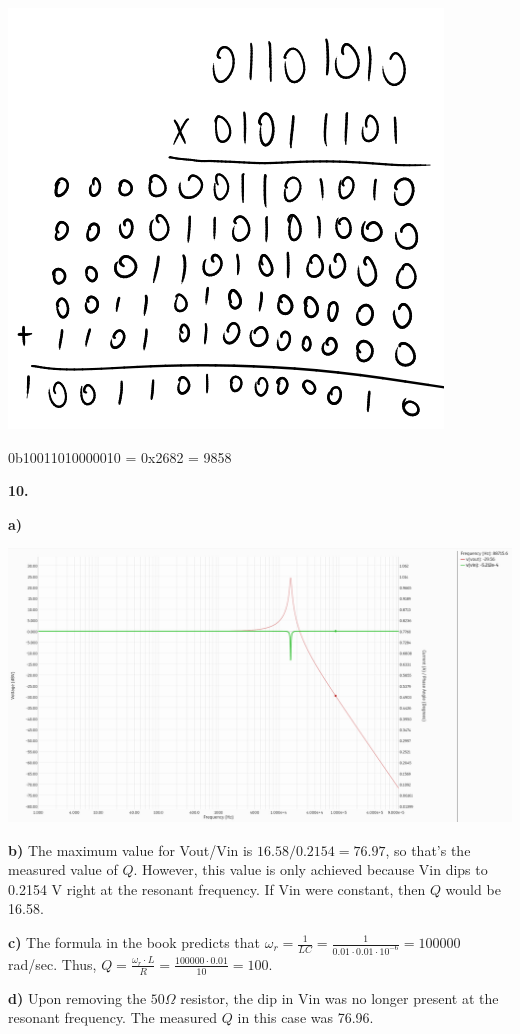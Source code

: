 \documentclass{article}
\begin{document}
    \begin{center}\includegraphics[scale=.5]{multiplication.png}\end{center}

    0b10011010000010 = 0x2682 = 9858

\newpage\noindent\textbf{10.}

\textbf{a)}
\begin{center}
    \includegraphics[scale=.3]{10a.png}
\end{center}

\textbf{b)} The maximum value for Vout/Vin is $16.58/0.2154 = 76.97$, so that's the measured value of $Q$. However, this value is only achieved because Vin dips to 0.2154 V right at the resonant frequency. If Vin were constant, then $Q$ would be 16.58.

\textbf{c)} The formula in the book predicts that $\omega_r = \frac1{LC} = \frac1{0.01 \cdot 0.01 \cdot 10^{-6}} = 100000$ rad/sec. Thus, $Q = \frac{\omega_r \cdot L}{R} = \frac{100000 \cdot 0.01}{10} = 100$.

\textbf{d)} Upon removing the $50\Omega$ resistor, the dip in Vin was no longer present at the resonant frequency. The measured $Q$ in this case was 76.96.
\end{document}
